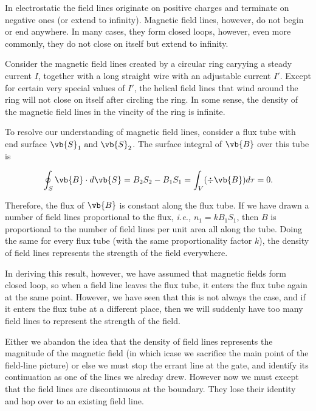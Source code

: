 \documentclass[english,a4paper,12pt]{report}
\begin{document}
In electrostatic the field lines originate on positive charges and terminate on negative ones (or extend to infinity). Magnetic field lines, however, do not begin or end anywhere. In many cases, they form closed loops, however, even more commonly, they do not close on itself but extend to infinity.

Consider the magnetic field lines created by a circular ring caryying a steady current \(I \), together with a long straight wire with an adjustable current \(I'\). Except for certain very special values of \(I'\), the helical field lines that wind around the ring will not close on itself after circling the ring. In some sense, the density of the magnetic field lines in the vincity of the ring is infinite.

To resolve our understanding of magnetic field lines, consider a flux tube with end surface \(\vb{S} _{1} \text { and } \vb{S} _{2} \). The surface integral of \(\vb{B} \) over this tube is

\begin{equation}
    \oint_{S} \vb{B} \cdot d\vb{S} = B_2 S_2 - B_1 S_1 = \int_{V}^{} (\div{\vb{B} } ) d\tau =0. 
\end{equation}

Therefore, the flux of \(\vb{B} \) is constant along the flux tube. If we have drawn a number of field lines proportional to the flux, \textit{i.e.,} \(n_1 = kB_1 S_1\), then \(B\) is proportional to the number of field lines per unit area all along the tube. Doing the same for every flux tube (with the same proportionality factor \(k\)), the density of field lines represents the strength of the field everywhere.  

In deriving this result, however, we have assumed that magnetic fields form closed loop, so when a field line leaves the flux tube, it enters the flux tube again at the same point. However, we have seen that this is not always the case, and if it enters the flux tube at a different place, then we will suddenly have too many field lines to represent the strength of the field. 

Either we abandon the idea that the density of field lines represents the magnitude of the magnetic field (in which icase we sacrifice the main point of the field-line picture) or else we must stop the errant line at the gate, and identify its continuation as one of the lines we alreday drew. However now we must except that the field lines are discontinuous at the boundary. They lose their identity and hop over to an existing field line.
\end{document}
